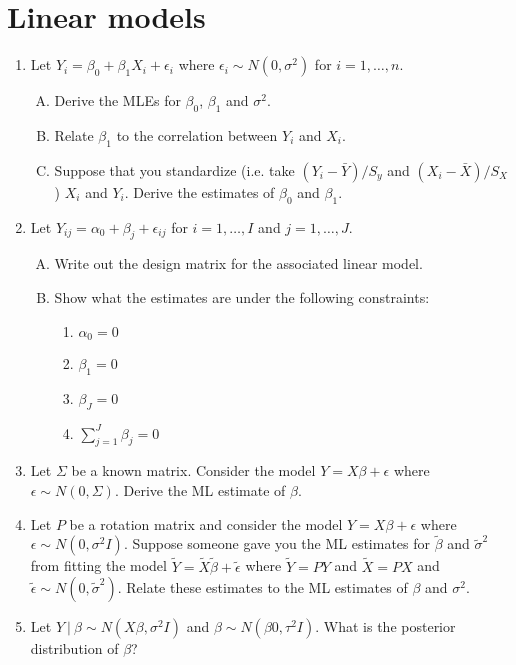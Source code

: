 \documentclass[12pt]{article}
\begin{document}
\section{Linear models}
\begin{enumerate}[1.]
\item Let $Y_i = \beta_0 + \beta_1 X_i + \epsilon_i$ where $\epsilon_i \sim N(0,\sigma^2)$ for $i=1,\ldots,n$.
  \begin{enumerate}[A.]
  \item Derive the MLEs for $\beta_0$, $\beta_1$ and $\sigma^2$.
  \item Relate $\beta_1$ to the correlation between $Y_i$ and $X_i$.
  \item Suppose that you standardize (i.e. take $(Y_i - \bar Y) / S_y$ and $(X_i - \bar X) / S_X$) $X_i$ and $Y_i$. Derive
    the estimates of $\beta_0$ and $\beta_1$.
  \end{enumerate}
\item Let $Y_{ij} = \alpha_0 + \beta_j + \epsilon_{ij}$ for $i = 1,\ldots, I$ and $j = 1,\ldots, J$.
  \begin{enumerate}[A.]
  \item Write out the design matrix for the associated linear model.
  \item Show what the estimates are under the following constraints:
    \begin{enumerate}
    \item $\alpha_0 = 0$
    \item $\beta_1 = 0$
    \item $\beta_J = 0$
    \item $\sum_{j=1}^J \beta_j = 0$
    \end{enumerate}
  \end{enumerate}
\item Let $\Sigma$ be a known matrix. Consider the model $Y = X\beta + \epsilon$ where $\epsilon \sim N(0, \Sigma)$. 
  Derive the ML estimate of $\beta$.
\item Let $P$ be a rotation matrix and consider the model $Y = X\beta
  + \epsilon$ where $\epsilon \sim N(0, \sigma^2 I)$.  Suppose someone gave you the
  ML estimates for $\tilde \beta$ and $\tilde \sigma^2$ from fitting
  the model $\tilde Y = \tilde X \tilde \beta + \tilde \epsilon$ where
  $\tilde Y = P Y$ and $\tilde X = PX$ and $\tilde \epsilon \sim N(0,
  \tilde \sigma^2)$. Relate these estimates to the ML estimates
  of $\beta$ and $\sigma^2$.
\item Let $Y ~|~ \beta \sim N(X\beta, \sigma^2 I)$ and $\beta \sim N(\beta0, \tau^2 I)$. What is the posterior distribution of $\beta$?

\end{enumerate}
\end{document}

